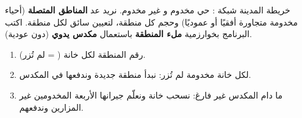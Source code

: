 \begin{statement}
خريطة المدينة شبكة :  حي مخدوم و غير مخدوم. نريد عد \textbf{المناطق المتصلة} (أحياء مخدومة متجاورة أفقيًا أو عموديًا) وحجم كل منطقة، لتعيين سائق لكل منطقة. اكتب البرنامج بخوارزمية \textbf{ملء المنطقة} باستعمال \textbf{مكدس يدوي} (دون عودية).
\end{statement}
\begin{stepsbox}\begin{enumerate}
\item {} رقم المنطقة لكل خانة ( = لم تُزر).
\item لكل خانة مخدومة لم تُزر: نبدأ منطقة جديدة وندفعها في المكدس.
\item ما دام المكدس غير فارغ: نسحب خانة ونعلّم جيرانها الأربعة المخدومين غير المزارين وندفعهم.
\end{enumerate}\end{stepsbox}
